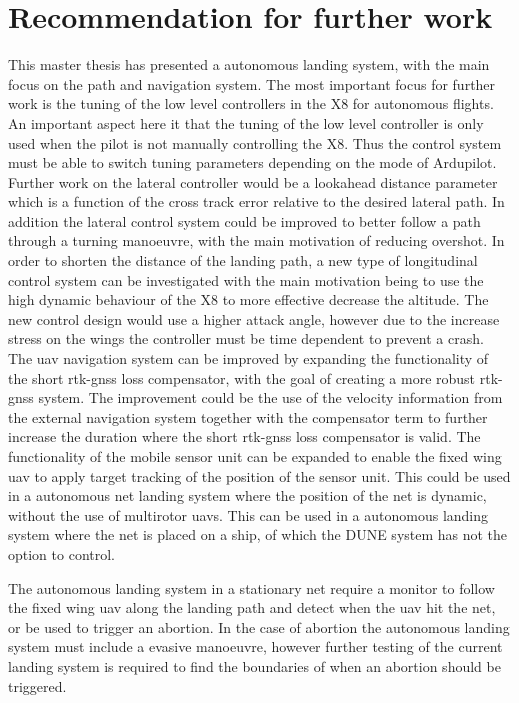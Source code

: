 \section{Recommendation for further work}
This master thesis has presented a autonomous landing system, with the main focus on the path and navigation system.
The most important focus for further work is the tuning of the low level controllers in the X8 for autonomous flights. An important aspect here it that the tuning of the low level controller is only used when the pilot is not manually controlling the X8. Thus the control system must be able to switch tuning parameters depending on the mode of Ardupilot. Further work on the lateral controller would be a lookahead distance parameter which is a function of the cross track error relative to the desired lateral path. In addition the lateral control system could be improved to better follow a path through a turning manoeuvre, with the main motivation of reducing overshot.
In order to shorten the distance of the landing path, a new type of longitudinal control system can be investigated with the main motivation being to use the high dynamic behaviour of the X8 to more effective decrease the altitude. The new control design would use a higher attack angle, however due to the increase stress on the wings the controller must be time dependent to prevent a crash.
The \gls{uav} navigation system can be improved by expanding the functionality of the short \gls{rtk-gnss} loss compensator, with the goal of creating a more robust \gls{rtk-gnss} system. The improvement could be the use of the velocity information from the external navigation system together with the compensator term to further increase the duration where the short \gls{rtk-gnss} loss compensator is valid.
The functionality of the mobile sensor unit can be expanded to enable the fixed wing \gls{uav} to apply target tracking of the position of the sensor unit. This could be used in a autonomous net landing system where the position of the net is dynamic, without the use of multirotor \glspl{uav}. This can be used in a autonomous landing system where the net is placed on a ship, of which the DUNE system has not the option to control.



The autonomous landing system in a stationary net require a monitor to follow the fixed wing \gls{uav} along the landing path and detect when the \gls{uav} hit the net, or be used to trigger an abortion. In the case of abortion the autonomous landing system must include a evasive manoeuvre, however further testing of the current landing system is required to find the boundaries of when an abortion should be triggered.